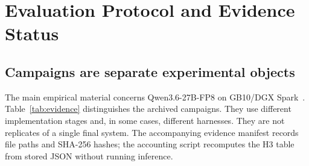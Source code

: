 \documentclass[conference]{IEEEtran}
\begin{document}
\section{Evaluation Protocol and Evidence Status}
\label{sec:protocol}
\subsection{Campaigns are separate experimental objects}
The main empirical material concerns Qwen3.6-27B-FP8 on GB10/DGX Spark~\cite{qwen2026qwen36fp8,lumo2026archive}. Table~\ref{tab:evidence} distinguishes the archived campaigns. They use different implementation stages and, in some cases, different harnesses. They are not replicates of a single final system. The accompanying evidence manifest records file paths and SHA-256 hashes; the accounting script recomputes the H3 table from stored JSON without running inference.
\end{document}
